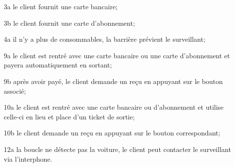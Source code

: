 \documentclass[a4paper]{article}
\begin{document}
\begin{description}
\begin{enumerate}
		\item[3a] le client fournit une carte bancaire;
		\item[3b] le client fournit une carte d'abonnement;
		\item[4a] il n'y a plus de consommables, la barri\`ere pr\'evient
			le surveillant;
		\item[9a] le client est rentr\'e avec une carte bancaire ou une
			carte d'abonnement et payera automatiquement en sortant;
		\item[9b] apr\`es avoir pay\'e, le client demande un re\c cu
			en appuyant sur le bouton associ\'e;
		\item[10a] le client est rentr\'e avec une carte bancaire ou
			d'abonnement et utilise celle-ci en lieu et place d'un
			ticket de sortie;
		\item[10b] le client demande un re\c cu en appuyant sur le
			bouton correspondant;
		\item[12a] la boucle ne d\'etecte pas la voiture, le client peut
			contacter le surveillant via l'interphone.
	\end{enumerate}
\end{description}
\end{document}
